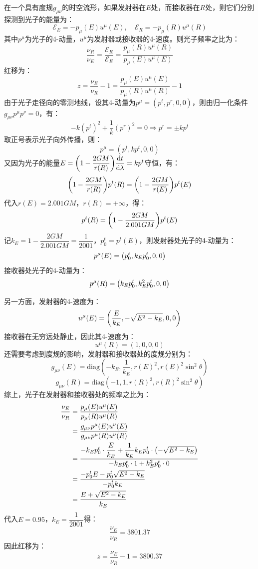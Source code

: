 \documentclass[a4paper]{article}
\begin{document}
\begin{enumerate}
    在一个具有度规$g_{\mu\nu}$的时空流形，如果发射器在$E$处，而接收器在$R$处，则它们分别探测到光子的能量为：
    \[
        \mathscr{E}_E = -p_{\mu}(E) u^{\mu}(E),\quad \mathscr{E}_R = -p_{\mu}(R) u^{\mu}(R)
    \]
    其中$p^\mu$为光子的4-动量，$u^\mu$为发射器或接收器的4-速度。则光子频率之比为：
    \[
        \frac{\nu_R}{\nu_E} = \frac{\mathscr{E}_R}{\mathscr{E}_E} = \frac{p_{\mu}(R) u^{\mu}(R)}{p_{\mu}(E) u^{\mu}(E)}
    \]
    红移为：
    \[
        z = \frac{\nu_E}{\nu_R} - 1 = \frac{p_{\mu}(E) u^{\mu}(E)}{p_{\mu}(R) u^{\mu}(R)} - 1
    \]
    由于光子走径向的零测地线，设其4-动量为$p^\mu = (p^t, p^r, 0, 0)$，则由归一化条件$g_{\mu\nu} p^\mu p^\nu = 0$，有：
    \[
        -k (p^t)^2 + \frac{1}{k} (p^r)^2 = 0 \Rightarrow p^r = \pm k p^t
    \]
    取正号表示光子向外传播，则：
    \[
        p^\mu = (p^t, k p^t, 0, 0)
    \]
    又因为光子的能量$E = \qty(1 - \dfrac{2GM}{r(R)}) \dfrac{\dd t}{\dd \lambda} = k p^t$守恒，有：
    \[
        \qty(1 - \frac{2GM}{r(R)}) p^t(R) = \qty(1 - \frac{2GM}{r(E)}) p^t(E)
    \]
    代入$r(E) = 2.001GM$，$r(R) = +\infty$，得：
    \[
        p^t(R) = \qty(1 - \frac{2GM}{2.001GM}) p^t(E)
    \]
    记$k_E = 1 - \dfrac{2GM}{2.001GM} = \dfrac{1}{2001}$，$p^t_0 = p^t(E)$，则发射器处光子的4-动量为：
    \[
        p^\mu(E) = \qty(p^t_0, k_E p^t_0, 0, 0)
    \]
    接收器处光子的4-动量为：
    \[
        p^\mu(R) = \qty(k_E p^t_0, k_E^2 p^t_0, 0, 0)
    \]

    另一方面，发射器的4-速度为：
    \[
        u^\mu(E) = \qty(\frac{E}{k_E}, -\sqrt{E^2 - k_E}, 0, 0)
    \]
    接收器在无穷远处静止，因此其4-速度为：
    \[
        u^\mu(R) = (1, 0, 0, 0)
    \]
    还需要考虑到度规的影响，发射器和接收器处的度规分别为：
    \[
        g_{\mu\nu}(E) = \mathrm{diag}(-k_E, \frac{1}{k_E}, r(E)^2, r(E)^2 \sin^2\theta)
    \]
    \[
        g_{\mu\nu}(R) = \mathrm{diag}(-1, 1, r(R)^2, r(R)^2 \sin^2\theta)
    \]
    综上，光子在发射器和接收器处的频率之比为：
    \begin{align*}
        \frac{\nu_E}{\nu_R}
        &= \frac{p_{\mu}(E) u^{\mu}(E)}{p_{\mu}(R) u^{\mu}(R)} \\
        &= \frac{g_{\mu\nu} p^\mu(E) u^\nu(E)}{g_{\mu\nu} p^\mu(R) u^\nu(R)} \\
        &= \frac{-k_E p^t_0 \cdot \dfrac{E}{k_E} + \dfrac{1}{k_E} k_E p^t_0 \cdot \qty(-\sqrt{E^2 - k_E})}{-k_E p^t_0 \cdot 1 + k_E^2 p^t_0 \cdot 0} \\
        &= \frac{-p^t_0 E - p^t_0 \sqrt{E^2 - k_E}}{-p^t_0 k_E} \\
        &= \frac{E + \sqrt{E^2 - k_E}}{k_E}
    \end{align*}
    代入$E = 0.95$，$k_E = \dfrac{1}{2001}$得：
    \[
        \frac{\nu_E}{\nu_R} = 3801.37
    \]
    因此红移为：
    \[
        z = \frac{\nu_E}{\nu_R} - 1 = 3800.37
    \]


\end{enumerate}
\end{document}
